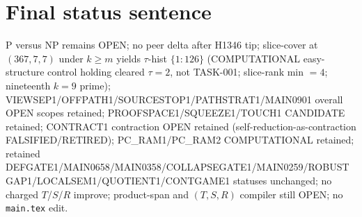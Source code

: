 \documentclass[11pt]{article}
\begin{document}
\section*{Final status sentence}
P versus NP remains OPEN; no peer delta after H1346 tip; slice-cover at $(367,7,7)$ under $k{\ge}m$ yields $\tau$-hist $\{1{:}126\}$ (COMPUTATIONAL easy-structure control holding cleared $\tau{=}2$, not TASK-001; slice-rank min $=4$; nineteenth $k{=}9$ prime); VIEWSEP1/OFFPATH1/SOURCESTOP1/PATHSTRAT1/MAIN0901 overall OPEN scopes retained; PROOFSPACE1/SQUEEZE1/TOUCH1 CANDIDATE retained; CONTRACT1 contraction OPEN retained (self-reduction-as-contraction FALSIFIED/RETIRED); PC\_RAM1/PC\_RAM2 COMPUTATIONAL retained; retained DEFGATE1/MAIN0658/MAIN0358/COLLAPSEGATE1/MAIN0259/ROBUSTGAP1/LOCALSEM1/QUOTIENT1/CONTGAME1 statuses unchanged; no charged $T$/$S$/$R$ improve; product-span and $(T,S,R)$ compiler still OPEN; no \texttt{main.tex} edit.
\end{document}
